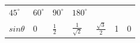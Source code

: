 {\begin{center}
\begin{xtabular*}{\mytablewidth}[t]{|p{10\mystarwidth}|p{10\mystarwidth}|p{10\mystarwidth}|p{10\mystarwidth}|p{10\mystarwidth}|p{10\mystarwidth}|p{10\mystarwidth}|}
                  ${45}^{\circ }$
                 &
                  ${60}^{\circ }$
                 &
                  ${90}^{\circ }$
                 &
                  ${180}^{\circ }$
     \tabularnewline{}
                  $sin\theta $
                 &
        0 &
                  $\frac{1}{2}$
                 &
                  $\frac{1}{\sqrt{2}}$
                 &
                  $\frac{\sqrt{3}}{2}$
                 &
        1 &
        0%

\end{xtabular*}
\end{center}}
